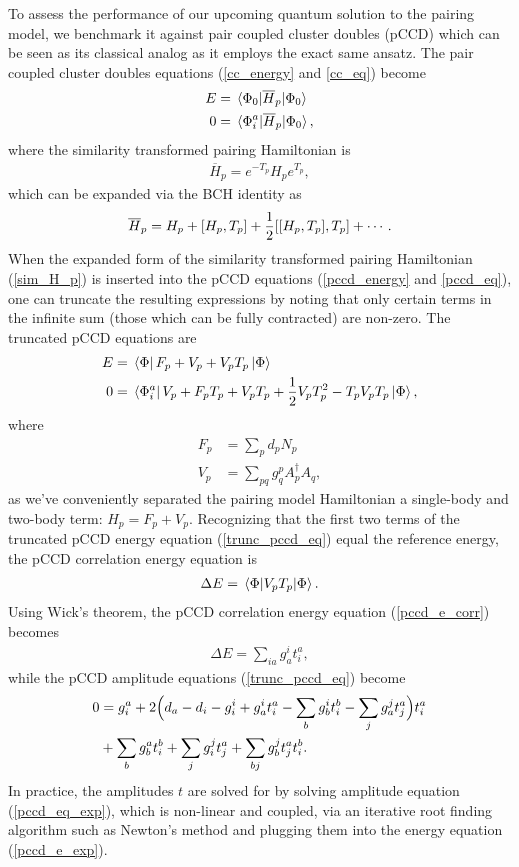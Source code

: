 \documentclass[Dual]{msu-thesis}
\begin{document}
To assess the performance of our upcoming quantum solution to the pairing model, we benchmark it against pair coupled cluster doubles (pCCD) which can be seen as its classical analog as it employs the exact same ansatz. The pair coupled cluster doubles equations (\ref{cc_energy} and \ref{cc_eq}) become
\begin{align}
\label{pccd_energy} 
E&=\mel{\Phi_0}{\overline{H}_p}{\Phi_0}
\\
\label{pccd_eq}
0&=\mel*{\Phi_i^a}{\overline{H}_p}{\Phi_0}
,\end{align}
where the similarity transformed pairing Hamiltonian is
\begin{align}
\overline{H}_p=e^{-T_p}H_pe^{T_p}
,\end{align}
which can be expanded via the BCH identity as
\begin{align}
\label{sim_H_p}
\overline{H}_p=H_p+\comm{H_p}{T_p}+\frac{1}{2}\comm{\comm{H_p}{T_p}}{T_p}+\cdots
.\end{align}
When the expanded form of the similarity transformed pairing Hamiltonian (\ref{sim_H_p}) is inserted into the pCCD equations (\ref{pccd_energy} and \ref{pccd_eq}), one can truncate the resulting expressions by noting that only certain terms in the infinite sum (those which can be fully contracted) are non-zero. The truncated pCCD equations are
\begin{align}
\label{trunc_pccd_e}
E
&=
\bra*{\Phi}F_p+V_p+V_pT_p\ket{\Phi}
\\
\label{trunc_pccd_eq}
0
&=
\bra*{\Phi_i^a}V_p+F_pT_p+V_pT_p+\frac{1}{2}V_pT_p^2-T_pV_pT_p\ket{\Phi}
,\end{align}
where
\begin{align}
F_p
&=
\sum_pd_pN_p
\\
V_p
&=
\sum_{pq}g^p_qA^\dagger_pA_q
,\end{align}
as we've conveniently separated the pairing model Hamiltonian a single-body and two-body term: $H_p=F_p+V_p$. Recognizing that the first two terms of the truncated pCCD energy equation (\ref{trunc_pccd_eq}) equal the reference energy, the pCCD correlation energy equation is
\begin{align}
\label{pccd_e_corr}
\Delta E = \mel{\Phi}{V_pT_p}{\Phi}
.\end{align}
Using Wick's theorem, the pCCD correlation energy equation (\ref{pccd_e_corr}) becomes
\begin{align}
\label{pccd_e_exp}
\Delta E=\sum_{ia}g_a^it_i^a
,\end{align}
while the pCCD amplitude equations (\ref{trunc_pccd_eq}) become
\begin{align}
\label{pccd_eq_exp}
0
&=
g^a_i+2\Big{(}d_a-d_i-g^i_i+g^i_at^a_i-\sum_bg^i_bt^b_i-\sum_jg^j_at^a_j\Big{)}t^a_i
\nonumber
\\
&+
\sum_bg^a_bt^b_i+\sum_jg^j_it^a_j+\sum_{bj}g^j_bt^a_jt^b_i
.\end{align}
In practice, the amplitudes $t$ are solved for by solving amplitude equation (\ref{pccd_eq_exp}), which is non-linear and coupled, via an iterative root finding algorithm such as Newton's method and plugging them into the energy equation (\ref{pccd_e_exp}).
\end{document}

